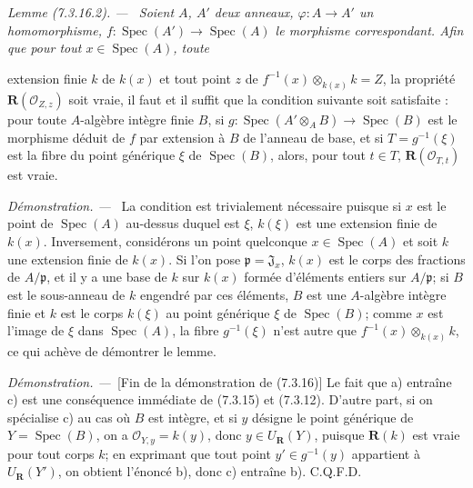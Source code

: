 \documentclass[10pt,oneside]{book}
\newcommand{\oldpage}[2][]{%
  \setcounter{footnote}{0}%
  \marginpar{\scriptsize\textbf{#1}~|~#2}\ignorespaces}
\newenvironment{lemma}[1][]{%
  \par\medskip\noindent\itshape Lemme (#1). ---\ }{\par}
\newenvironment{proof}{%
  \par\medskip\noindent\textit{Démonstration. ---\ }}{\par}
\begin{document}
\begin{lemma}[7.3.16.2]
\label{IV.2.s7.3.16.2-fr}
Soient $A$, $A'$ deux anneaux, $\varphi:A\to A'$ un homomorphisme,
$f:\operatorname{Spec}(A')\to\operatorname{Spec}(A)$ le morphisme
correspondant. Afin que pour tout $x\in\operatorname{Spec}(A)$, toute

\oldpage[IV-2]{197}

extension finie $k$ de $k(x)$ et tout point $z$ de
$f^{-1}(x)\otimes_{k(x)}k=Z$, la propriété
$\boldsymbol R(\mathscr O_{Z,z})$ soit vraie, il faut et il suffit que la
condition suivante soit satisfaite : pour toute $A$-algèbre intègre finie
$B$, si
$g:\operatorname{Spec}(A'\otimes_A B)\to\operatorname{Spec}(B)$ est le
morphisme déduit de $f$ par extension à $B$ de l'anneau de base, et si
$T=g^{-1}(\xi)$ est la fibre du point générique $\xi$ de
$\operatorname{Spec}(B)$, alors, pour tout $t\in T$,
$\boldsymbol R(\mathscr O_{T,t})$ est vraie.
\end{lemma}

\begin{proof}
La condition est trivialement nécessaire puisque si $x$ est le point de
$\operatorname{Spec}(A)$ au-dessus duquel est $\xi$, $k(\xi)$ est une
extension finie de $k(x)$. Inversement, considérons un point quelconque
$x\in\operatorname{Spec}(A)$ et soit $k$ une extension finie de $k(x)$.
Si l'on pose $\mathfrak p=\mathfrak J_x$, $k(x)$ est le corps des
fractions de $A/\mathfrak p$, et il y a une base de $k$ sur $k(x)$ formée
d'éléments entiers sur $A/\mathfrak p$; si $B$ est le sous-anneau de $k$
engendré par ces éléments, $B$ est une $A$-algèbre intègre finie et $k$
est le corps $k(\xi)$ au point générique $\xi$ de
$\operatorname{Spec}(B)$; comme $x$ est l'image de $\xi$ dans
$\operatorname{Spec}(A)$, la fibre $g^{-1}(\xi)$ n'est autre que
$f^{-1}(x)\otimes_{k(x)}k$, ce qui achève de démontrer le lemme.
\end{proof}

\begin{proof}[Fin de la démonstration de (7.3.16)]
Le fait que a) entraîne c) est une conséquence immédiate de (7.3.15) et
(7.3.12). D'autre part, si on spécialise c) au cas où $B$ est intègre, et
si $y$ désigne le point générique de $Y=\operatorname{Spec}(B)$, on a
$\mathscr O_{Y,y}=k(y)$, donc $y\in U_{\boldsymbol R}(Y)$, puisque
$\boldsymbol R(k)$ est vraie pour tout corps $k$; en exprimant que tout
point $y'\in g^{-1}(y)$ appartient à $U_{\boldsymbol R}(Y')$, on obtient
l'énoncé b), donc c) entraîne b). C.Q.F.D.
\end{proof}
\end{document}
